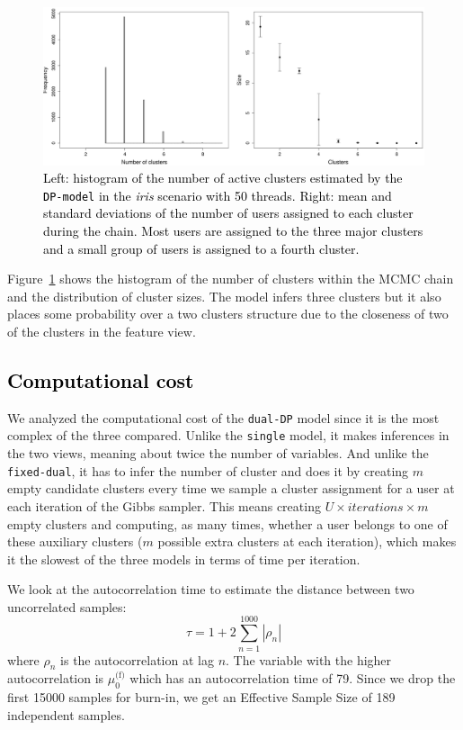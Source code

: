 \documentclass[smallextended]{svjour3}          %
\newcommand\alberto[1]{\textcolor{black}{#1}}
\newcommand{\muo}{\mu_{0}^\text{(f)}}
\begin{document}
\begin{figure}
	\centering
	\includegraphics[width=1\textwidth]{Fig10_ncomponents}
	\caption{\alberto{Left: histogram of the number of active clusters estimated by the \texttt{DP-model} in the \textit{iris} scenario with 50 threads. Right: mean and standard deviations of the number of users assigned to each cluster during the chain. Most users are assigned to the three major clusters and a small group of users is assigned to a fourth cluster.}}
	\label{fig:nclusters}
\end{figure}

Figure~\ref{fig:nclusters} shows the histogram of the number of clusters within the MCMC chain and the distribution of cluster sizes. The model infers three clusters but it also places some probability over a two clusters structure due to the closeness of two of the clusters in the feature view.  

\subsection{\alberto{Computational cost}}
We analyzed the computational cost of the \texttt{dual-DP} model since it is the most complex of the three compared. Unlike the \texttt{single} model, it makes inferences in the two views, meaning about twice the number of variables.  And unlike the \texttt{fixed-dual}, it has to infer the number of cluster and does it by creating $m$ empty candidate clusters every time we sample a cluster assignment for a user at each iteration of the Gibbs sampler. This means creating $U \times iterations \times m$ empty clusters and computing, as many times, whether a user belongs to one of these auxiliary clusters ($m$ possible extra clusters at each iteration), which makes it the slowest of the three models in terms of time per iteration.

We look at the autocorrelation time to estimate the distance between two uncorrelated samples:
\begin{equation*}
	\tau = 1 + 2\sum_{n=1}^{1000} |\rho_n|
\end{equation*} 
where $\rho_n$ is the autocorrelation at lag $n$. The variable with the higher autocorrelation is $\muo$ which has an autocorrelation time of 79. Since we drop the first 15000 samples for burn-in, we get an Effective Sample Size of 189 independent samples.
\end{document}
